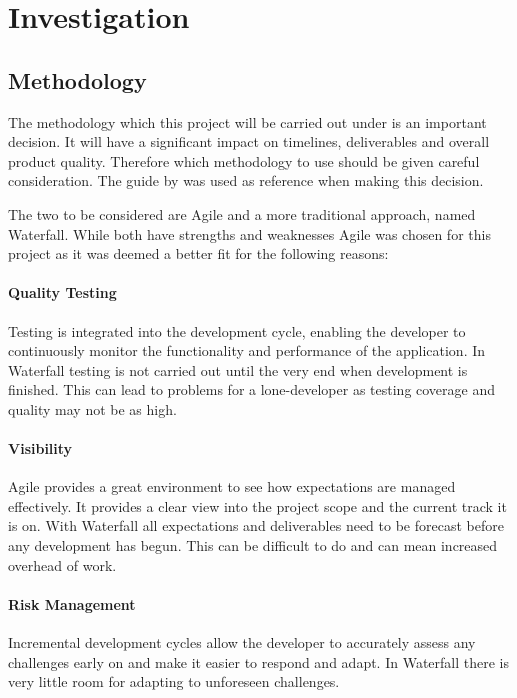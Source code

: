 \section{Investigation}

\subsection{Methodology}
\label{subs:agile}

The methodology which this project will be carried out under is an important decision. It will have a significant impact on timelines, deliverables and overall product quality. Therefore which methodology to use should be given careful consideration. The guide by \citep{Manifesto2016} was used as reference when making this decision.

The two to be considered are Agile and a more traditional approach, named Waterfall. While both have strengths and weaknesses Agile was chosen for this project as it was deemed a better fit for the following reasons:

\paragraph{Quality Testing} Testing is integrated into the development cycle, enabling the developer to continuously monitor the functionality and performance of the application. In Waterfall testing is not carried out until the very end when development is finished. This can lead to problems for a lone-developer as testing coverage and quality may not be as high. 

\paragraph{Visibility} Agile provides a great environment to see how expectations are managed effectively. It provides a clear view into the project scope and the current track it is on. With Waterfall all expectations and deliverables need to be forecast before any development has begun. This can be difficult to do and can mean increased overhead of work.

\paragraph{Risk Management} Incremental development cycles allow the developer to accurately assess any challenges early on and make it easier to respond and adapt. In Waterfall there is very little room for adapting to unforeseen challenges.

